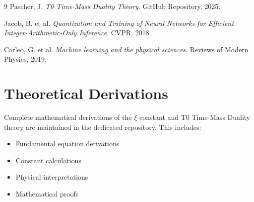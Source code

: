 	\begin{thebibliography}{9}
		Pascher, J. \textit{T0 Time-Mass Duality Theory}. 
		GitHub Repository, 2025.
		
		Jacob, B. et al. \textit{Quantization and Training of Neural Networks for Efficient Integer-Arithmetic-Only Inference}. 
		CVPR, 2018.
		
		Carleo, G. et al. \textit{Machine learning and the physical sciences}. 
		Reviews of Modern Physics, 2019.
	\end{thebibliography}
	
	\appendix
	\section{Theoretical Derivations}
	
	Complete mathematical derivations of the $\xi$ constant and T0 Time-Mass Duality theory are maintained in the dedicated repository. This includes:
	
	\begin{itemize}
		\item Fundamental equation derivations
		\item Constant calculations
		\item Physical interpretations
		\item Mathematical proofs
	\end{itemize}
